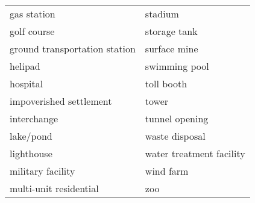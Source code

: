 \documentclass[../thesis.tex]{subfiles}
\begin{document}
\begin{table}[h]
\begin{tabular}{@{}ll@{}}
    		gas station                   & stadium                  \\
    		golf course                   & storage tank             \\
    		ground transportation station & surface mine             \\
    		helipad                       & swimming pool            \\
    		hospital                      & toll booth               \\
    		impoverished settlement       & tower                    \\
    		interchange                   & tunnel opening           \\
    		lake/pond                     & waste disposal           \\
    		lighthouse                    & water treatment facility \\
    		military facility             & wind farm                \\
    		multi-unit residential        & zoo                      \\ \bottomrule
    	\end{tabular}
    \end{table}
\end{document}
